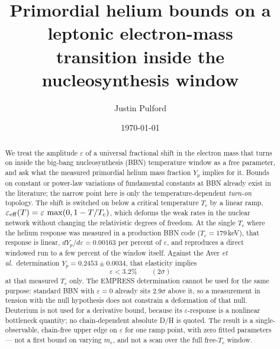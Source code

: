 \documentclass[aps,prd,twocolumn,superscriptaddress,nofootinbib,10pt]{revtex4-2}
\begin{document}
\title{Primordial helium bounds on a leptonic electron-mass\\
transition inside the nucleosynthesis window}

\author{Justin Pulford}

\date{\today}

\begin{abstract}
We treat the amplitude $\varepsilon$ of a universal fractional shift in the electron mass that
turns on inside the big-bang nucleosynthesis (BBN) temperature window as a free parameter, and ask
what the measured primordial helium mass fraction $Y_p$ implies for it. Bounds on constant or
power-law variations of fundamental constants at BBN already exist in the literature; the narrow
point here is only the temperature-dependent \emph{turn-on} topology. The shift is switched on
below a critical temperature $T_c$ by a linear ramp,
$\varepsilon_{\rm eff}(T)=\varepsilon\,\max(0,1-T/T_c)$, which deforms the weak rates in the
nuclear network without changing the relativistic degrees of freedom. At the single $T_c$ where
the helium response was measured in a production BBN code ($T_c=179\,$keV), that response is
linear, $dY_p/d\varepsilon = 0.00163$ per percent of $\varepsilon$, and reproduces a direct
windowed run to a few percent of the window itself. Against the Aver \emph{et al.}\ determination
$Y_p=0.2453\pm 0.0034$, that elasticity implies
%
\begin{equation*}
  \varepsilon < 3.2\% \qquad (2\sigma)
\end{equation*}
%
at that measured $T_c$ only. The EMPRESS determination cannot be used for the same purpose:
standard BBN with $\varepsilon=0$ already sits $2.9\sigma$ above it, so a measurement in tension
with the null hypothesis does not constrain a deformation of that null. Deuterium is not used for
a derivative bound, because its $\varepsilon$-response is a nonlinear bottleneck quantity; no
chain-dependent absolute D/H is quoted. The result is a single-observable, chain-free upper edge
on $\varepsilon$ for one ramp point, with zero fitted parameters --- not a first bound on
varying $m_e$, and not a scan over the full free-$T_c$ window.
\end{abstract}

\maketitle

\end{document}
